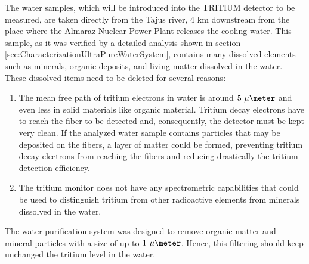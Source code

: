 The water samples, which will be introduced into the TRITIUM detector to be measured, are taken directly from the Tajus river, 4 km downstream from the place where the Almaraz Nuclear Power Plant releases the cooling water. This sample, as it was verified by a detailed analysis shown in section \ref{sec:CharacterizationUltraPureWaterSystem}, contains many dissolved elements such as minerals, organic deposits, and living matter dissolved in the water. These dissolved items need to be deleted for several reasons:

\begin{enumerate}

\item{} The mean free path of tritium electrons in water is around $5~\mu\meter$ and even less in solid materials like organic material. Tritium decay electrons have to reach the fiber to be detected and, consequently, the detector must be kept very clean. If the analyzed water sample contains particles that may be deposited on the fibers, a layer of matter could be formed, preventing tritium decay electrons from reaching the fibers and reducing drastically the tritium detection efficiency.

\item{} The tritium monitor does not have any spectrometric capabilities that could be used to distinguish tritium from other radioactive elements from minerals dissolved in the water.

\end{enumerate}

The water purification system was designed to remove organic matter and mineral particles with a size of up to $1~\mu\meter$. Hence, this filtering should keep unchanged the tritium level in the water. 





